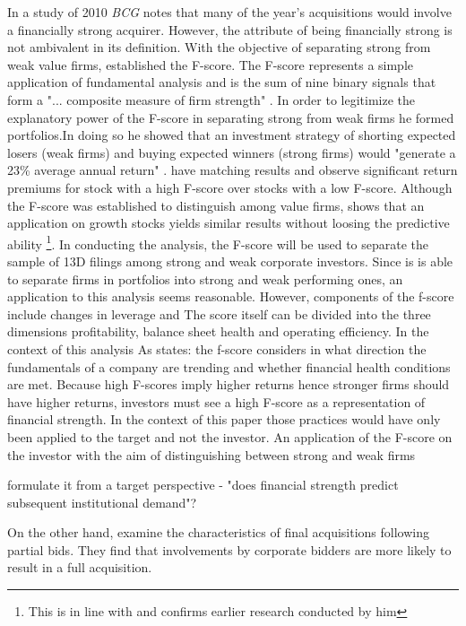 \documentclass[12pt]{article}
\begin{document}
In a study of 2010 \emph{BCG} notes that many of the year's acquisitions would involve a financially strong acquirer. However, the attribute of being financially strong is not ambivalent in its definition. With the objective of separating strong from weak value firms, \citet{Piotroski2000} established the F-score. The F-score represents a simple application of fundamental analysis and is the sum of nine binary signals that form a "... composite measure of firm strength" \citep[p. 496]{Fama2006}. In order to legitimize the explanatory power of the F-score in separating strong from weak firms he formed portfolios.In doing so he showed that an investment strategy of shorting expected losers (weak firms) and buying expected winners (strong firms) would "generate a 23\% average annual return" \citep[p. 4]{Piotroski2000}. \citet{Hyde2014} have matching results and observe significant return premiums for stock with a high F-score over stocks with a low F-score. Although the F-score was established to distinguish among value firms, \citet{Mohr2012} shows that an application on growth stocks yields similar results without loosing the predictive ability \footnote{This is in line with \citet{Piotroski2000} and confirms earlier research conducted by him}.
In conducting the analysis, the F-score will be used to separate  the sample of 13D filings among strong and weak corporate investors. Since is is able to separate firms in portfolios into strong and weak performing ones, an application to this analysis seems reasonable. 
However, components of the f-score include changes in leverage and The score itself can be divided into the three dimensions profitability, balance sheet health and operating efficiency. 
In the context of this analysis As \citet{Mohr2012} states: the f-score considers in what direction the fundamentals of a company are trending and whether financial health conditions are met.  Because high F-scores imply higher returns hence stronger firms should have higher returns, investors must see a high F-score as a representation of financial strength. In the context of this paper those practices would have only been applied to the target and not the investor. An application of the F-score on the investor with the aim of distinguishing between strong and weak firms 


\citet{Choi2012} formulate it from a target perspective - "does financial strength predict subsequent institutional demand"? 


On the other hand, \citet{Akhigbe2007} examine the characteristics of final acquisitions following partial bids. They find that involvements by corporate bidders are more likely to result in a full acquisition. 

\end{document}

